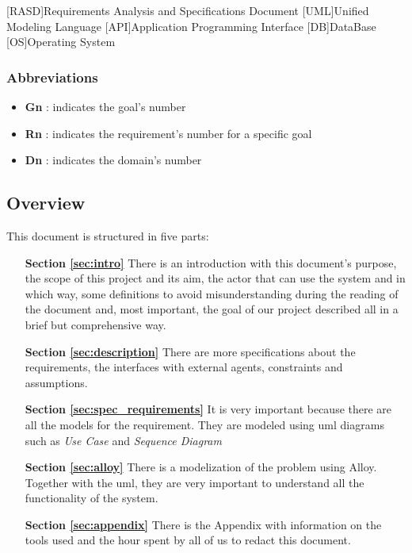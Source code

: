 \begin{acronym}[RASD] %

[RASD]{Requirements Analysis and Specifications Document}
[UML]{Unified Modeling Language}
[API]{Application Programming Interface}
[DB]{DataBase}
[OS]{Operating System}

\end{acronym}

\subsubsection{Abbreviations} \label{abbre}
\begin{itemize}
\item \textbf{Gn} : indicates the goal's number
\item \textbf{Rn} : indicates the requirement's number for a specific goal
\item \textbf{Dn} : indicates the domain's number
\end{itemize}


\subsection{Overview} \label{subsec:overview}
This document is structured in five parts:
\begin{itemize}
\item[\textbf{Section \ref{sec:intro}}]There is an introduction with this document's purpose, the scope of this project and its aim, the actor that can use the system and in which way, some definitions to avoid misunderstanding during the reading of the document and, most important, the goal of our project described all in a brief but comprehensive way.  
\item[\textbf{Section \ref{sec:description}}]There are more specifications about the requirements, the interfaces with external agents, constraints and assumptions.
\item[\textbf{Section \ref{sec:spec_requirements}}]It is very important because there are all the models for the requirement. They are modeled using \acs{uml} diagrams such as \emph{Use Case} and \emph{Sequence Diagram}
\item[\textbf{Section \ref{sec:alloy}}]There is a modelization of the problem using Alloy. Together with the \acs{uml}, they are very important to understand all the functionality of the system.  
\item[\textbf{Section \ref{sec:appendix}}]There is the Appendix with information on the tools used and the hour spent by all of us to redact this document.
\end{itemize}

